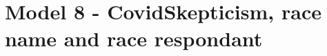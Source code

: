 \documentclass[]{report}
\begin{document}



\chapter{Model 8 - CovidSkepticism, race name and race respondant}
\end{document}

